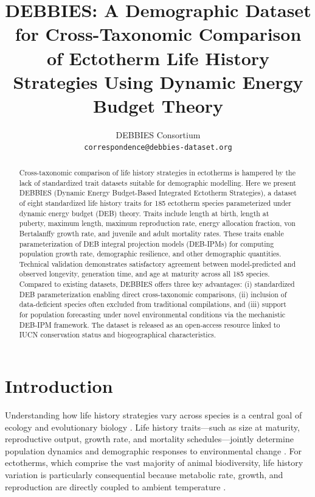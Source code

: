 \documentclass[11pt]{article}
\title{DEBBIES: A Demographic Dataset for Cross-Taxonomic Comparison of Ectotherm Life History Strategies Using Dynamic Energy Budget Theory}
\author{%
  DEBBIES Consortium\\
  \texttt{correspondence@debbies-dataset.org}
}
\date{}
\begin{document}
\maketitle

\begin{abstract}
Cross-taxonomic comparison of life history strategies in ectotherms is hampered by the lack of standardized trait datasets suitable for demographic modelling. Here we present DEBBIES (Dynamic Energy Budget-Based Integrated Ectotherm Strategies), a dataset of eight standardized life history traits for 185 ectotherm species parameterized under dynamic energy budget (DEB) theory. Traits include length at birth, length at puberty, maximum length, maximum reproduction rate, energy allocation fraction, von Bertalanffy growth rate, and juvenile and adult mortality rates. These traits enable parameterization of DEB integral projection models (DEB-IPMs) for computing population growth rate, demographic resilience, and other demographic quantities. Technical validation demonstrates satisfactory agreement between model-predicted and observed longevity, generation time, and age at maturity across all 185 species. Compared to existing datasets, DEBBIES offers three key advantages: (i) standardized DEB parameterization enabling direct cross-taxonomic comparisons, (ii) inclusion of data-deficient species often excluded from traditional compilations, and (iii) support for population forecasting under novel environmental conditions via the mechanistic DEB-IPM framework. The dataset is released as an open-access resource linked to IUCN conservation status and biogeographical characteristics.
\end{abstract}

\section{Introduction}

Understanding how life history strategies vary across species is a central goal of ecology and evolutionary biology \citep{stearns1992,roff2002}. Life history traits---such as size at maturity, reproductive output, growth rate, and mortality schedules---jointly determine population dynamics and demographic responses to environmental change \citep{salguero2016}. For ectotherms, which comprise the vast majority of animal biodiversity, life history variation is particularly consequential because metabolic rate, growth, and reproduction are directly coupled to ambient temperature \citep{angilletta2009}.
\end{document}
